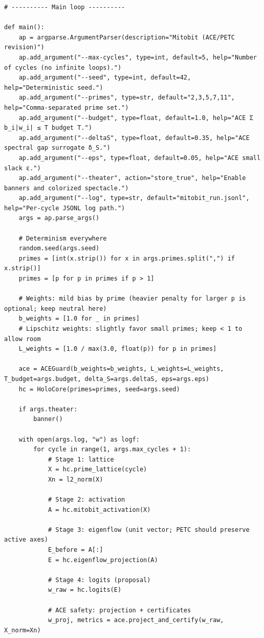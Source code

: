 \documentclass[11pt]{article}
\begin{document}
\begin{lstlisting}[style=py,caption={Mitobit (ACE/PETC revision). Self-contained script with weighted-$\ell_1$ projection, ACE surrogates, and PETC prime-lawfulness.},label={lst:code}]
# ---------- Main loop ----------

def main():
    ap = argparse.ArgumentParser(description="Mitobit (ACE/PETC revision)")
    ap.add_argument("--max-cycles", type=int, default=5, help="Number of cycles (no infinite loops).")
    ap.add_argument("--seed", type=int, default=42, help="Deterministic seed.")
    ap.add_argument("--primes", type=str, default="2,3,5,7,11", help="Comma-separated prime set.")
    ap.add_argument("--budget", type=float, default=1.0, help="ACE Σ b_i|w_i| ≤ T budget T.")
    ap.add_argument("--deltaS", type=float, default=0.35, help="ACE spectral gap surrogate δ_S.")
    ap.add_argument("--eps", type=float, default=0.05, help="ACE small slack ε.")
    ap.add_argument("--theater", action="store_true", help="Enable banners and colorized spectacle.")
    ap.add_argument("--log", type=str, default="mitobit_run.jsonl", help="Per-cycle JSONL log path.")
    args = ap.parse_args()

    # Determinism everywhere
    random.seed(args.seed)
    primes = [int(x.strip()) for x in args.primes.split(",") if x.strip()]
    primes = [p for p in primes if p > 1]

    # Weights: mild bias by prime (heavier penalty for larger p is optional; keep neutral here)
    b_weights = [1.0 for _ in primes]
    # Lipschitz weights: slightly favor small primes; keep < 1 to allow room
    L_weights = [1.0 / max(3.0, float(p)) for p in primes]

    ace = ACEGuard(b_weights=b_weights, L_weights=L_weights, T_budget=args.budget, delta_S=args.deltaS, eps=args.eps)
    hc = HoloCore(primes=primes, seed=args.seed)

    if args.theater:
        banner()

    with open(args.log, "w") as logf:
        for cycle in range(1, args.max_cycles + 1):
            # Stage 1: lattice
            X = hc.prime_lattice(cycle)
            Xn = l2_norm(X)

            # Stage 2: activation
            A = hc.mitobit_activation(X)

            # Stage 3: eigenflow (unit vector; PETC should preserve active axes)
            E_before = A[:]
            E = hc.eigenflow_projection(A)

            # Stage 4: logits (proposal)
            w_raw = hc.logits(E)

            # ACE safety: projection + certificates
            w_proj, metrics = ace.project_and_certify(w_raw, X_norm=Xn)


\end{lstlisting}
\end{document}
